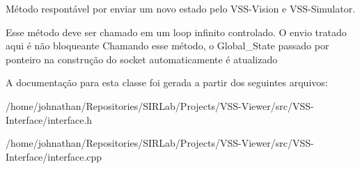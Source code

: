 Método respontável por enviar um novo estado pelo V\+S\+S-\/\+Vision e V\+S\+S-\/\+Simulator. 

Esse método deve ser chamado em um loop infinito controlado. O envio tratado aqui é não bloqueante Chamando esse método, o Global\+\_\+\+State passado por ponteiro na construção do socket automaticamente é atualizado 

A documentação para esta classe foi gerada a partir dos seguintes arquivos\+:\begin{DoxyCompactItemize}
\item 
/home/johnathan/\+Repositories/\+S\+I\+R\+Lab/\+Projects/\+V\+S\+S-\/\+Viewer/src/\+V\+S\+S-\/\+Interface/interface.\+h\item 
/home/johnathan/\+Repositories/\+S\+I\+R\+Lab/\+Projects/\+V\+S\+S-\/\+Viewer/src/\+V\+S\+S-\/\+Interface/interface.\+cpp\end{DoxyCompactItemize}
